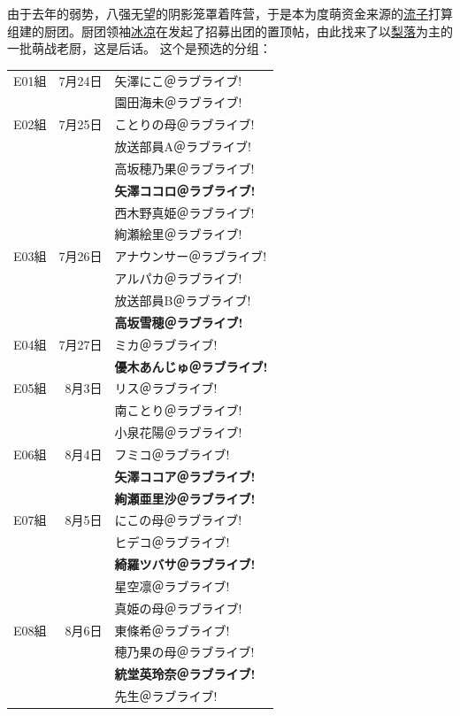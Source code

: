 由于去年的弱势，八强无望的阴影笼罩着阵营，于是本为度萌资金来源的\uline{流子}打算组建的厨团。厨团领袖\uline{冰凉}在发起了招募出团的置顶帖，由此找来了以\uline{梨落}为主的一批萌战老厨，这是后话。
这个是预选的分组：

\def\iD{\mincho}
\def\iA{\minchob}
\def\iB{\mincho\bfseries}
{\mincho{}
\begin{longtable}{|rrl|}\hline
E01組 & 7月24日 & \iA 矢澤にこ＠ラブライブ!\\
 & & \iA 園田海未＠ラブライブ!\\\hline
E02組 & 7月25日 & \iD ことりの母＠ラブライブ!\\
 & & \iD 放送部員A＠ラブライブ!\\
 & & \iA 高坂穂乃果＠ラブライブ!\\
 & & \iB 矢澤ココロ＠ラブライブ!\\
 & & \iA 西木野真姫＠ラブライブ!\\
 & & \iA 絢瀬絵里＠ラブライブ!\\\hline
E03組 & 7月26日 & \iD アナウンサー＠ラブライブ!\\
 & & \iD アルパカ＠ラブライブ!\\
 & & \iD 放送部員B＠ラブライブ!\\
 & & \iB 高坂雪穂＠ラブライブ!\\\hline
E04組 & 7月27日 & \iD ミカ＠ラブライブ!\\
 & & \iB 優木あんじゅ＠ラブライブ!\\\hline
E05組 & 8月3日 & \iD リス＠ラブライブ!\\
 & & \iA 南ことり＠ラブライブ!\\
 & & \iA 小泉花陽＠ラブライブ!\\\hline
E06組 & 8月4日 & \iD フミコ＠ラブライブ!\\
 & & \iB 矢澤ココア＠ラブライブ!\\
 & & \iB 絢瀬亜里沙＠ラブライブ!\\\hline
E07組 & 8月5日 & \iD にこの母＠ラブライブ!\\
 & & \iD ヒデコ＠ラブライブ!\\
 & & \iB 綺羅ツバサ＠ラブライブ!\\
 & & \iA 星空凛＠ラブライブ!\\
 & & \iD 真姫の母＠ラブライブ!\\\hline
E08組 & 8月6日 & \iA 東條希＠ラブライブ!\\
 & & \iD 穂乃果の母＠ラブライブ!\\
 & & \iB 統堂英玲奈＠ラブライブ!\\
 & & \iD 先生＠ラブライブ!\\\hline
\end{longtable}}

